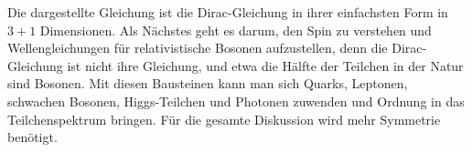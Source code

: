 \begin{classroomqa}
\end{classroomqa}

Die dargestellte Gleichung ist die Dirac-Gleichung in ihrer einfachsten Form in \(3+1\) Dimensionen. Als Nächstes geht es darum, den Spin zu verstehen und Wellengleichungen für relativistische Bosonen aufzustellen, denn die Dirac-Gleichung ist nicht ihre Gleichung, und etwa die Hälfte der Teilchen in der Natur sind Bosonen. Mit diesen Bausteinen kann man sich Quarks, Leptonen, schwachen Bosonen, Higgs-Teilchen und Photonen zuwenden und Ordnung in das Teilchenspektrum bringen. Für die gesamte Diskussion wird mehr Symmetrie benötigt.
